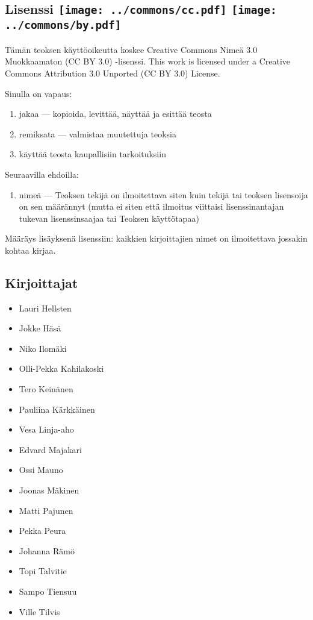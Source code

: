 \subsection*{Lisenssi \texttt{[image: ../commons/cc.pdf]} \texttt{[image: ../commons/by.pdf]}}

Tämän teoksen käyttöoikeutta koskee Creative Commons Nimeä 3.0 Muokkaamaton (CC BY 3.0) -lisenssi.
This work is licensed under a Creative Commons Attribution 3.0 Unported (CC BY 3.0) License.


Sinulla on vapaus:
\begin{enumerate}
\item jakaa — kopioida, levittää, näyttää ja esittää teosta
\item remiksata — valmistaa muutettuja teoksia
\item käyttää teosta kaupallisiin tarkoituksiin
\end{enumerate}
Seuraavilla ehdoilla:
\begin{enumerate}
\item nimeä — Teoksen tekijä on ilmoitettava siten kuin tekijä tai teoksen lisensoija on sen määrännyt (mutta ei siten että ilmoitus viittaisi lisenssinantajan tukevan lisenssinsaajaa tai Teoksen käyttötapaa)
\end{enumerate}

Määräys lisäyksenä lisenssiin: kaikkien kirjoittajien nimet on ilmoitettava jossakin kohtaa kirjaa.



\newpage
\subsection*{Kirjoittajat}
\begin{itemize}
\item Lauri Hellsten
\item Jokke Häsä
\item Niko Ilomäki
\item Olli-Pekka Kahilakoski
\item Tero Keinänen
\item Pauliina Kärkkäinen
\item Vesa Linja-aho
\item Edvard Majakari
\item Ossi Mauno
\item Joonas Mäkinen
\item Matti Pajunen
\item Pekka Peura
\item Johanna Rämö
\item Topi Talvitie
\item Sampo Tiensuu
\item Ville Tilvis
\end{itemize}

